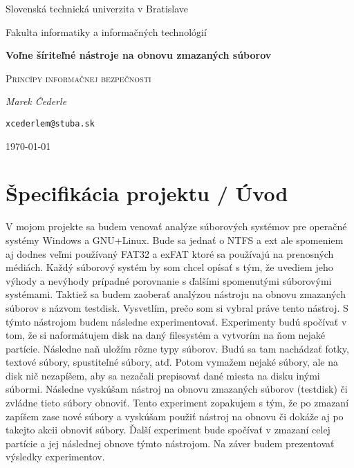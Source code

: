 \documentclass[12pt,oneside,slovak,a4paper]{article}
\begin{document}

\begin{titlepage}
	\centering
    {\Large Slovenská technická univerzita v Bratislave\par}
    {\Large Fakulta informatiky a informačných technológií\par}
	\vspace{7cm}
	{\huge\bfseries Voľne šíriteľné nástroje na obnovu zmazaných súborov\par}
	\vspace{0.5cm}
    {\Large \textsc{Princípy informačnej bezpečnosti}\par}
    \vspace{1cm}
	{\Large\itshape Marek Čederle\par}
    {\small\texttt{xcederlem@stuba.sk}\par}
	\vfill

	{\large \today\par}
\end{titlepage}


\tableofcontents
\vspace*{\fill}

\section{Špecifikácia projektu / Úvod}
V mojom projekte sa budem venovať analýze súborových systémov pre operačné systémy Windows a GNU+Linux. Bude sa jednať o NTFS a ext ale spomeniem aj dodnes veľmi používaný FAT32 a exFAT ktoré sa používajú na prenosných médiách. Každý súborový systém by som chcel opísať s tým, že uvediem jeho výhody a nevýhody prípadné porovnanie s ďalšími spomenutými súborovými systémami. Taktiež sa budem zaoberať analýzou nástroju na obnovu zmazaných súborov s názvom testdisk. Vysvetlím, prečo som si vybral práve tento nástroj. S týmto nástrojom budem následne experimentovať. Experimenty budú spočívať v tom, že si naformátujem disk na daný filesystém a vytvorím na ňom nejaké partície. Následne naň uložím rôzne typy súborov. Budú sa tam nachádzať fotky, textové súbory, spustiteľné súbory, atď. Potom vymažem nejaké súbory, ale na disk nič nezapíšem, aby sa nezačali prepisovať dané miesta na disku inými súbormi. Následne vyskúšam nástroj na obnovu zmazaných súborov (testdisk) či zvládne tieto súbory obnoviť. Tento experiment zopakujem s tým, že po zmazaní zapíšem zase nové súbory a vyskúšam použiť nástroj na obnovu či dokáže aj po takejto akcii obnoviť súbory. Ďalší experiment bude spočívať v zmazaní celej partície a jej následnej obnove týmto nástrojom. Na záver budem prezentovať výsledky experimentov.
\end{document}
